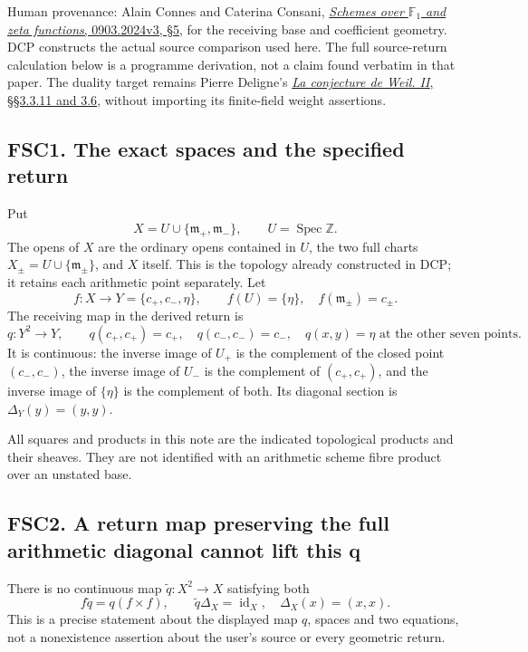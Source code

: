 Human provenance: Alain Connes and Caterina Consani,
\href{https://arxiv.org/abs/0903.2024v3}{\emph{Schemes over
\(\mathbb F_1\) and zeta functions}, 0903.2024v3, §5}, for the receiving
base and coefficient geometry. DCP constructs the actual source
comparison used here. The full source-return calculation below is a
programme derivation, not a claim found verbatim in that paper. The
duality target remains Pierre Deligne's
\href{https://www.numdam.org/item/PMIHES_1980__52__137_0/}{\emph{La
conjecture de Weil. II}, §§3.3.11 and 3.6}, without importing its
finite-field weight assertions.

\subsection{FSC1. The exact spaces and the specified
return}\label{fsc1.-the-exact-spaces-and-the-specified-return}

Put \[
X=U\cup\{\mathfrak m_+,\mathfrak m_-\},\qquad U=\operatorname{Spec}\mathbb Z.
\] The opens of \(X\) are the ordinary opens contained in \(U\), the two
full charts \(X_\pm=U\cup\{\mathfrak m_\pm\}\), and \(X\) itself. This
is the topology already constructed in DCP; it retains each arithmetic
point separately. Let \[
f:X\to Y=\{c_+,c_-,\eta\},\qquad f(U)=\{\eta\},\quad f(\mathfrak m_\pm)=c_\pm.
\tag{FSC1.1}
\] The receiving map in the derived return is \[
q:Y^2\to Y,\qquad
q(c_+,c_+)=c_+,\quad q(c_-,c_-)=c_-,\quad
q(x,y)=\eta\text{ at the other seven points}.
\tag{FSC1.2}
\] It is continuous: the inverse image of \(U_+\) is the complement of
the closed point \((c_-,c_-)\), the inverse image of \(U_-\) is the
complement of \((c_+,c_+)\), and the inverse image of \(\{\eta\}\) is
the complement of both. Its diagonal section is \(\Delta_Y(y)=(y,y)\).

All squares and products in this note are the indicated topological
products and their sheaves. They are not identified with an arithmetic
scheme fibre product over an unstated base.

\subsection{FSC2. A return map preserving the full arithmetic diagonal
cannot lift this
q}\label{fsc2.-a-return-map-preserving-the-full-arithmetic-diagonal-cannot-lift-this-q}

There is no continuous map \(\widetilde q:X^2\to X\) satisfying both \[
f\widetilde q=q(f\times f),\qquad \widetilde q\Delta_X=\operatorname{id}_X,
\quad\Delta_X(x)=(x,x).
\tag{FSC2.1}
\] This is a precise statement about the displayed map \(q\), spaces and
two equations, not a nonexistence assertion about the user's source or
every geometric return.

